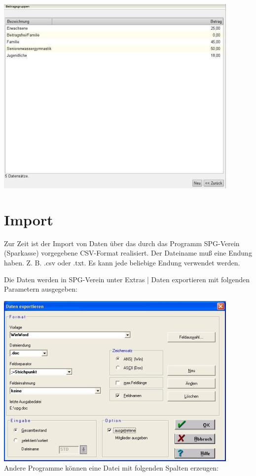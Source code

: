 \documentclass[a4paper,BCOR30mm,DIV14,pdftex,liststotoc,footsepline,openany]{scrbook}
\begin{document}
\includegraphics{./screenshots/beitragsgruppen.jpg}\\

\section{Import}
Zur Zeit ist der Import von Daten über das durch das Programm SPG-Verein (Sparkasse) vorgegebene CSV-Format realisiert. Der Dateiname muß eine Endung haben. Z. B. .csv oder .txt. Es kann jede beliebige Endung verwendet werden.

Die Daten werden in SPG-Verein unter Extras | Daten exportieren mit folgenden Parametern ausgegeben:

\includegraphics{./screenshots/spgexport.jpg}\\
Andere Programme können eine Datei mit folgenden Spalten erzeugen:\\
\end{document}
